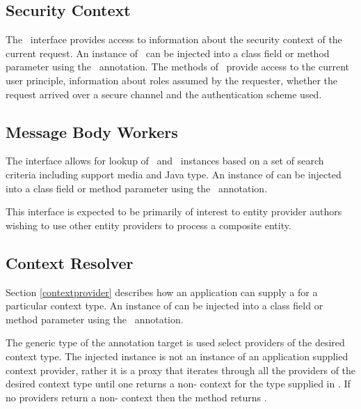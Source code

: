 \subsection{Security Context}

The \SecurityContext\ interface provides access to information about the security context of the current request. An instance of \SecurityContext\ can be injected into a class field or method parameter using the \Context\ annotation. The methods of \SecurityContext\ provide access to the current user principle, information about roles assumed by the requester, whether the request arrived over a secure channel and the authentication scheme used.

\subsection{Message Body Workers}

The  interface allows for lookup of \MsgRead\ and \MsgWrite\ instances based on a set of search criteria including support media and Java type. An instance of  can be injected into a class field or method parameter using the \Context\ annotation.

This interface is expected to be primarily of interest to entity provider authors wishing to use other entity providers to process a composite entity.

\subsection{Context Resolver}
\label{contextresolver}

Section \ref{contextprovider} describes how an application can supply a  for a particular context type. An instance of  can be injected into a class field or method parameter using the \Context\ annotation. 

The generic type of the annotation target is used select providers of the desired context type. The injected instance is not an instance of an application supplied context provider, rather it is a proxy that iterates through all the providers of the desired context type until one returns a non- context for the type supplied in . If no providers return a non- context then the  method returns .
